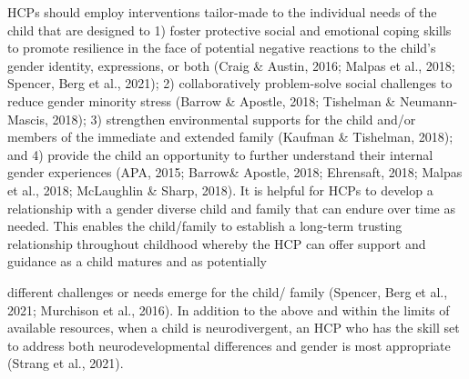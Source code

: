 \documentclass[
]{book}
\begin{document}
HCPs should employ interventions tailor-made
to the individual needs of the child that are
designed to 1) foster protective social and emotional coping skills to promote resilience in the
face of potential negative reactions to the child's
gender identity, expressions, or both (Craig \&
Austin, 2016; Malpas et al., 2018; Spencer, Berg
et al., 2021); 2) collaboratively problem-solve
social challenges to reduce gender minority stress
(Barrow \& Apostle, 2018; Tishelman \&
Neumann-Mascis, 2018); 3) strengthen environmental supports for the child and/or members of
the immediate and extended family (Kaufman \&
Tishelman, 2018); and 4) provide the child an
opportunity to further understand their internal
gender experiences (APA, 2015; Barrow\& Apostle,
2018; Ehrensaft, 2018; Malpas et al., 2018;
McLaughlin \& Sharp, 2018). It is helpful for HCPs
to develop a relationship with a gender diverse
child and family that can endure over time as
needed. This enables the child/family to establish
a long-term trusting relationship throughout
childhood whereby the HCP can offer support
and guidance as a child matures and as potentially

different challenges or needs emerge for the child/
family (Spencer, Berg et al., 2021; Murchison
et al., 2016). In addition to the above and within
the limits of available resources, when a child is
neurodivergent, an HCP who has the skill set to
address both neurodevelopmental differences and
gender is most appropriate (Strang et al., 2021).
\end{document}
